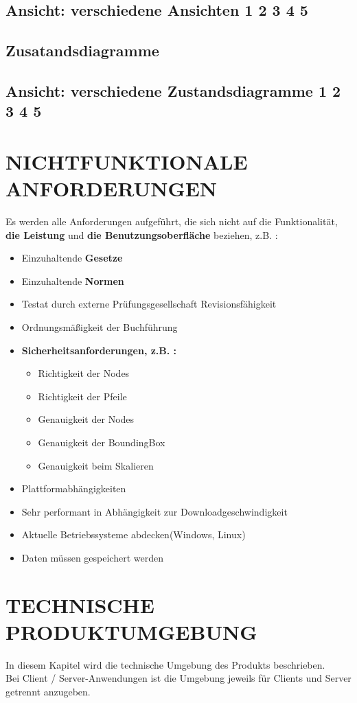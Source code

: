 	\subsection{Ansicht: verschiedene Ansichten 1 2 3 4 5}
	\subsection{Zusatandsdiagramme}
	\subsection{Ansicht: verschiedene Zustandsdiagramme 1 2 3 4 5}
	
	
	\section{\Large NICHTFUNKTIONALE ANFORDERUNGEN}
	Es werden alle Anforderungen aufgeführt, die sich nicht auf die Funktionalität, \textbf{ die Leistung} und \textbf{ die Benutzungsoberfläche} beziehen, z.B. :
	\begin{itemize}
		\item Einzuhaltende \textbf{Gesetze}
		\item Einzuhaltende \textbf{Normen}
		\item Testat durch externe Prüfungsgesellschaft
		Revisionsfähigkeit 
		\item Ordnungsmäßigkeit der Buchführung
		\item \textbf{ Sicherheitsanforderungen, z.B. :}
		\begin{itemize}
			\item Richtigkeit der Nodes
			\item Richtigkeit der Pfeile
			\item Genauigkeit der Nodes
			\item Genauigkeit der BoundingBox
			\item Genauigkeit beim Skalieren
		\end{itemize}  
		\item Plattformabhängigkeiten
		\item Sehr performant in Abhängigkeit zur Downloadgeschwindigkeit
		\item Aktuelle Betriebssysteme abdecken(Windows, Linux)
		\item Daten müssen gespeichert werden	 
	\end{itemize} 

	
	\section{\Large TECHNISCHE PRODUKTUMGEBUNG}
   	In diesem Kapitel wird die technische Umgebung des Produkts beschrieben.\\
   	Bei Client / Server-Anwendungen ist die Umgebung jeweils für Clients und Server getrennt anzugeben.
